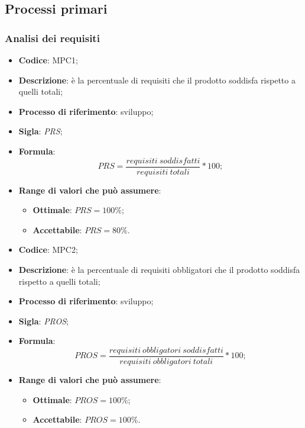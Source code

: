 \subsection{Processi primari}
\subsubsection{Analisi dei requisiti}
\vspace{-1cm}
\begin{itemize}
	\item \textbf{Codice}: MPC1;
	\item \textbf{Descrizione}: è la percentuale di requisiti che il prodotto soddisfa rispetto a quelli totali;
	\item \textbf{Processo di riferimento}: sviluppo;
	\item \textbf{Sigla}: \textit{PRS};
	\item \textbf{Formula}: \[ PRS = \frac{requisiti \ soddisfatti}{requisiti \ totali} \ast 100; \]
	\item \textbf{Range di valori che può assumere}:
		\begin{itemize}
			\item \textbf{Ottimale}: $PRS = 100 \%$;
			\item \textbf{Accettabile}: $PRS = 80 \%$.
		\end{itemize}
\end{itemize}
\vspace{-1cm}
\begin{itemize}
	\item \textbf{Codice}: MPC2;
	\item \textbf{Descrizione}: è la percentuale di requisiti obbligatori che il prodotto soddisfa rispetto a quelli totali;
	\item \textbf{Processo di riferimento}: sviluppo;
	\item \textbf{Sigla}: \textit{PROS};
	\item \textbf{Formula}: \[ PROS = \frac{requisiti \ obbligatori \ soddisfatti}{requisiti \ obbligatori \ totali} \ast 100; \]
	\item \textbf{Range di valori che può assumere}:
		\begin{itemize}
			\item \textbf{Ottimale}: $PROS = 100 \%$;
			\item \textbf{Accettabile}: $PROS = 100 \%$.
		\end{itemize}
\end{itemize}